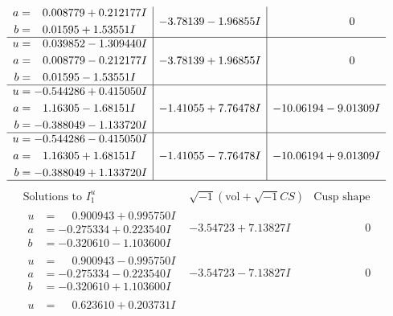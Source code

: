 \documentclass[1p]{elsarticle_modified}
\theoremstyle{definition}
\newcommand{\I}{\sqrt{-1}}
\begin{document}
$$\begin{array}{c|c|c}
\begin{aligned}
a &= \phantom{-}0.008779 + 0.212177 I \\
b &= \phantom{-}0.01595 + 1.53551 I\end{aligned}
 & -3.78139 - 1.96855 I & \phantom{-0.000000 } 0 \\ \hline\begin{aligned}
u &= \phantom{-}0.039852 - 1.309440 I \\
a &= \phantom{-}0.008779 - 0.212177 I \\
b &= \phantom{-}0.01595 - 1.53551 I\end{aligned}
 & -3.78139 + 1.96855 I & \phantom{-0.000000 } 0 \\ \hline\begin{aligned}
u &= -0.544286 + 0.415050 I \\
a &= \phantom{-}1.16305 - 1.68151 I \\
b &= -0.388049 - 1.133720 I\end{aligned}
 & -1.41055 + 7.76478 I & -10.06194 - 9.01309 I \\ \hline\begin{aligned}
u &= -0.544286 - 0.415050 I \\
a &= \phantom{-}1.16305 + 1.68151 I \\
b &= -0.388049 + 1.133720 I\end{aligned}
 & -1.41055 - 7.76478 I & -10.06194 + 9.01309 I\\
 \hline 
 \end{array}$$\newpage$$\begin{array}{c|c|c}  
\text{Solutions to }I^u_{1}& \I (\text{vol} + \sqrt{-1}CS) & \text{Cusp shape}\\
 \hline 
\begin{aligned}
u &= \phantom{-}0.900943 + 0.995750 I \\
a &= -0.275334 + 0.223540 I \\
b &= -0.320610 - 1.103600 I\end{aligned}
 & -3.54723 + 7.13827 I & \phantom{-0.000000 } 0 \\ \hline\begin{aligned}
u &= \phantom{-}0.900943 - 0.995750 I \\
a &= -0.275334 - 0.223540 I \\
b &= -0.320610 + 1.103600 I\end{aligned}
 & -3.54723 - 7.13827 I & \phantom{-0.000000 } 0 \\ \hline\begin{aligned}
u &= \phantom{-}0.623610 + 0.203731 I \\

\end{aligned}
\end{array}$$
\end{document}
